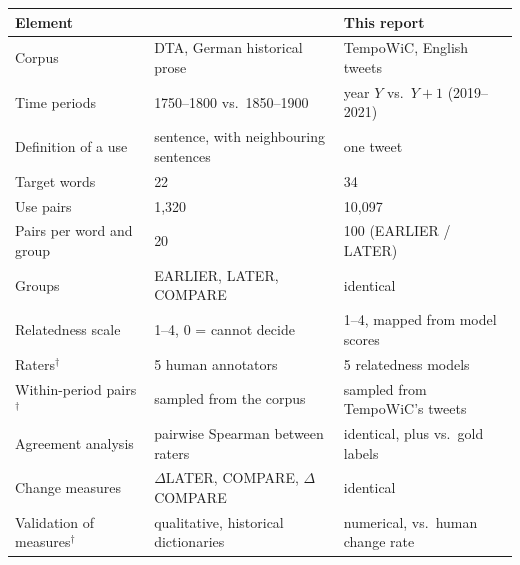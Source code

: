 \begin{tabular}{@{}lll@{}}
\toprule
Element & \citet{schlechtweg2018durel} & This report \\
\midrule
Corpus & DTA, German historical prose & TempoWiC, English tweets \\
Time periods & 1750--1800 vs.\ 1850--1900 & year $Y$ vs.\ $Y{+}1$ (2019--2021) \\
Definition of a use & sentence, with neighbouring sentences & one tweet \\
Target words & 22 & 34 \\
Use pairs & 1{,}320 & 10{,}097 \\
Pairs per word and group & 20 & 100 (EARLIER / LATER) \\
Groups & EARLIER, LATER, COMPARE & identical \\
Relatedness scale & 1--4, 0 = cannot decide & 1--4, mapped from model scores \\
Raters$^\dagger$ & 5 human annotators & 5 relatedness models \\
Within-period pairs$^\dagger$ & sampled from the corpus & sampled from TempoWiC's tweets \\
Agreement analysis & pairwise Spearman between raters & identical, plus vs.\ gold labels \\
Change measures & $\Delta$LATER, COMPARE, $\Delta$COMPARE & identical \\
Validation of measures$^\dagger$ & qualitative, historical dictionaries & numerical, vs.\ human change rate \\
\bottomrule
\end{tabular}